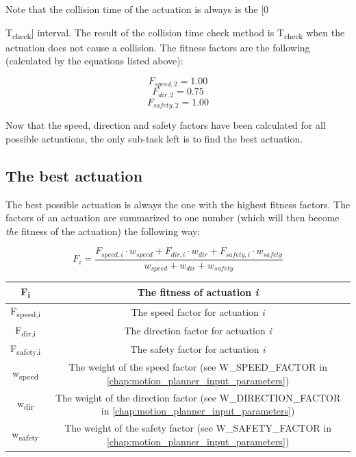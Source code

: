 Note that the collision time of the actuation is always is the [0 {T\textsubscript{check}] interval. The result of the collision time check method is T\textsubscript{check} when the actuation does not cause a collision. The fitness factors are the following (calculated by the equations listed above):

\[ F_{speed,2} = 1.00 \]
\[ F_{dir,2} = 0.75 \]
\[ F_{safety,2} = 1.00 \]

Now that the speed, direction and safety factors have been calculated for all possible actuations, the only sub-task left is to find the best actuation.

\begin{minipage}{\textwidth}
\subsection{The best actuation}

The best possible actuation is always the one with the highest fitness factors. The factors of an actuation are summarized to one number (which will then become \textit{the} fitness of the actuation) the following way:

\[ F_{i} = \frac{F_{speed,i} \cdot w_{speed} + F_{dir,i} \cdot w_{dir} + F_{safety,i} \cdot w_{safety}}{w_{speed} + w_{dir} + w_{safety}} \]
\end{minipage}

\begin{center}
    \begin{tabular}{ | c | c | }
        \hline
        F\textsubscript{i}  		& The fitness of actuation \textit{i}                                                                         \\
        \hline
        F\textsubscript{speed,i}  	& The speed factor for actuation \textit{i}                                                                   \\
        \hline
        F\textsubscript{dir,i}  	& The direction factor for actuation \textit{i}                                                               \\
        \hline
        F\textsubscript{safety,i}  	& The safety factor for actuation \textit{i}                                                                  \\
        \hline
        w\textsubscript{speed}  	& The weight of the speed factor (see W\_SPEED\_FACTOR in \ref{chap:motion_planner_input_parameters})         \\
        \hline
        w\textsubscript{dir}  		& The weight of the direction factor (see W\_DIRECTION\_FACTOR in \ref{chap:motion_planner_input_parameters}) \\
        \hline
        w\textsubscript{safety}  	& The weight of the safety factor (see W\_SAFETY\_FACTOR in \ref{chap:motion_planner_input_parameters})       \\
        \hline
    \end{tabular}
\end{center}

}

